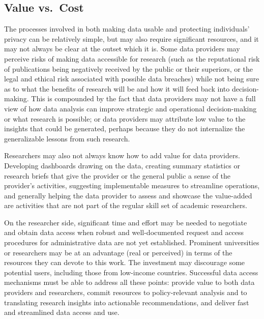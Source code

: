 \documentclass[
]{book}
\begin{document}
\hypertarget{value-vs.-cost}{%
\subsection{Value vs.~Cost}\label{value-vs.-cost}}

The processes involved in both making data usable and protecting individuals' privacy can be relatively simple, but may also require significant resources, and it may not always be clear at the outset which it is. Some data providers may perceive risks of making data accessible for research (such as the reputational risk of publications being negatively received by the public or their superiors, or the legal and ethical risk associated with possible data breaches) while not being sure as to what the benefits of research will be and how it will feed back into decision-making. This is compounded by the fact that data providers may not have a full view of how data analysis can improve strategic and operational decision-making or what research is possible; or data providers may attribute low value to the insights that could be generated, perhaps because they do not internalize the generalizable lessons from such research.

Researchers may also not always know how to add value for data providers. Developing dashboards drawing on the data, creating summary statistics or research briefs that give the provider or the general public a sense of the provider's activities, suggesting implementable measures to streamline operations, and generally helping the data provider to assess and showcase the value-added are activities that are not part of the regular skill set of academic researchers.

On the researcher side, significant time and effort may be needed to negotiate and obtain data access when robust and well-documented request and access procedures for administrative data are not yet established. Prominent universities or researchers may be at an advantage (real or perceived) in terms of the resources they can devote to this work. The investment may discourage some potential users, including those from low-income countries. Successful data access mechanisms must be able to address all these points: provide value to both data providers and researchers, commit resources to policy-relevant analysis and to translating research insights into actionable recommendations, and deliver fast and streamlined data access and use.
\end{document}
